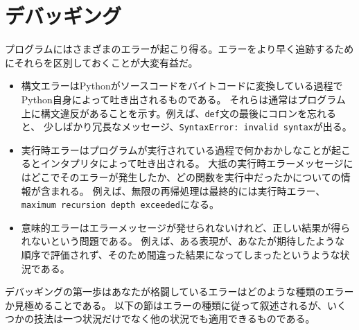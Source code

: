 \documentclass[a4j,12pt,makeidx]{jbook}
\begin{document}
\chapter{デバッギング} 
プログラムにはさまざまのエラーが起こり得る。エラーをより早く追跡するためにそれらを区別しておくことが大変有益だ。
\begin{itemize}
\item 構文エラーはPythonがソースコードをバイトコードに変換している過程でPython自身によって吐き出されるものである。
それらは通常はプログラム上に構文違反があることを示す。例えば、{\tt def}文の最後にコロンを忘れると、
少しばかり冗長なメッセージ、{\tt SyntaxError: invalid syntax}が出る。
\item 実行時エラーはプログラムが実行されている過程で何かおかしなことが起こるとインタプリタによって吐き出される。
大抵の実行時エラーメッセージにはどこでそのエラーが発生したか、どの関数を実行中だったかについての情報が含まれる。
例えば、無限の再帰処理は最終的には実行時エラー、{\tt maximum recursion depth exceeded}になる。
\item 意味的エラーはエラーメッセージが発せられないけれど、正しい結果が得られないという問題である。
例えば、ある表現が、あなたが期待したような順序で評価されず、そのため間違った結果になってしまったというような状況である。
\end{itemize}
デバッギングの第一歩はあなたが格闘しているエラーはどのような種類のエラーか見極めることである。
以下の節はエラーの種類に従って叙述されるが、いくつかの技法は一つ状況だけでなく他の状況でも適用できるものである。
%
\end{document}

